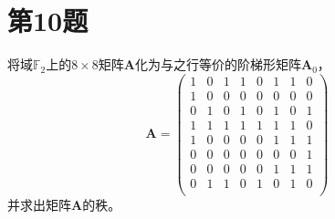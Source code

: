\section{第10题}
将域$\mathbb{F}_2$上的$8\times 8$矩阵$\bm{A}$化为与之行等价的阶梯形矩阵$\bm{A}_0$，
\begin{equation}
    \bm{A} = \left(
        \begin{smallmatrix}
            1 &0 &1 &1 &0 &1 &1 &0\\
            1 &0 &0 &0 &0 &0 &0 &0\\
            0 &1 &0 &1 &0 &1 &0 &1\\
            1 &1 &1 &1 &1 &1 &1 &0\\
            1 &0 &0 &0 &0 &1 &1 &1\\
            0 &0 &0 &0 &0 &0 &0 &1\\
            0 &0 &0 &0 &0 &1 &1 &1\\
            0 &1 &1 &0 &1 &0 &1 &0\\
        \end{smallmatrix}
    \right)
\end{equation}
并求出矩阵$\bm{A}$的秩。

